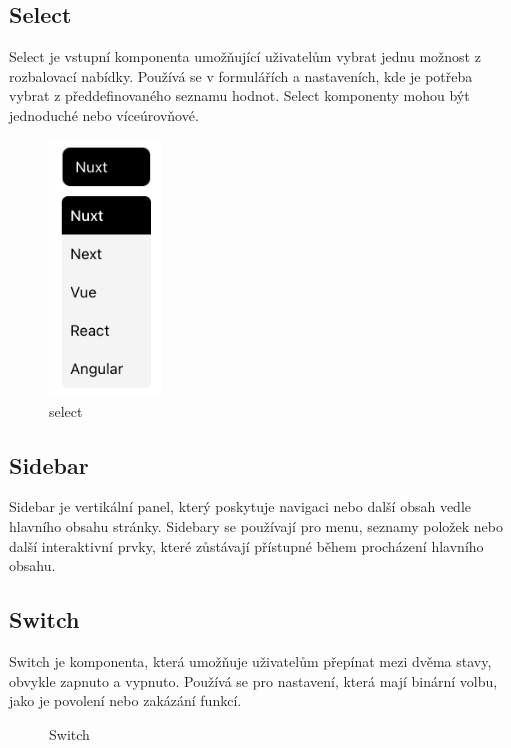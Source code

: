 \subsection{Select}
Select je vstupní komponenta umožňující uživatelům vybrat jednu možnost z rozbalovací nabídky. Používá se v formulářích a nastaveních, kde je potřeba vybrat z předdefinovaného seznamu hodnot. Select komponenty mohou být jednoduché nebo víceúrovňové.

\begin{figure}[H]
  \centering
  \includegraphics[width=3cm]{images/select}
  \captionsetup{justification=centering,margin=2cm}
  \caption{select} \label{picture:select}
\end{figure}

\subsection{Sidebar}
Sidebar je vertikální panel, který poskytuje navigaci nebo další obsah vedle hlavního obsahu stránky. Sidebary se používají pro menu, seznamy položek nebo další interaktivní prvky, které zůstávají přístupné během procházení hlavního obsahu.

\subsection{Switch}
Switch je komponenta, která umožňuje uživatelům přepínat mezi dvěma stavy, obvykle zapnuto a vypnuto. Používá se pro nastavení, která mají binární volbu, jako je povolení nebo zakázání funkcí.

\begin{figure}[H]
  \centering
  \hspace{1cm}
  \captionsetup{justification=centering,margin=2cm}
  \caption{Switch}
\end{figure}


